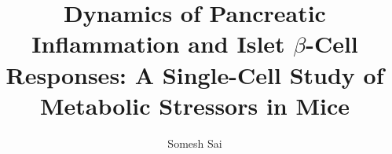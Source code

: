



\title{Dynamics of Pancreatic Inflammation and Islet $\beta$-Cell Responses: A Single-Cell Study of Metabolic Stressors in Mice}



\renewcommand{\submissiontext}{Inaugural-Dissertation\\
to obtain the academic degree\\
\textbf{Doctor rerum naturalium (Dr. rer. nat.)}\\
submitted to the Department of Biology, Chemistry, Pharmacy\\
of Freie Universität Berlin\\
by}



\author{Somesh Sai}






